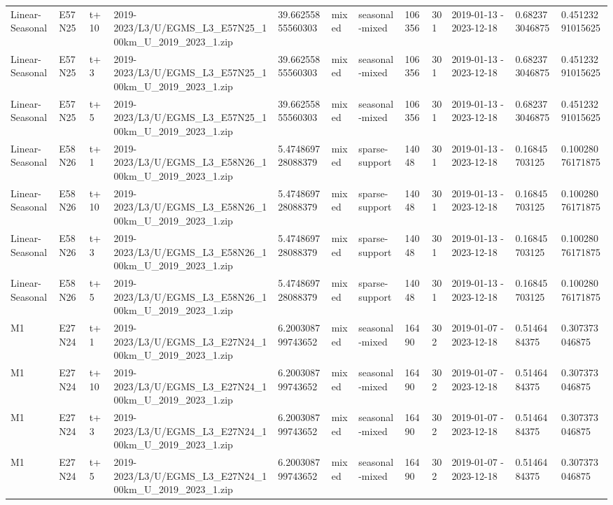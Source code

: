 \begin{landscape}
\begin{longtable}{llllllllllll}
Linear-Seasonal & E57N25 & t+10 & 2019-2023/L3/U/EGMS\_L3\_E57N25\_100km\_U\_2019\_2023\_1.zip & 39.66255855560303 & mixed & seasonal-mixed & 106356 & 301 & 2019-01-13 - 2023-12-18 & 0.682373046875 & 0.45123291015625 \\
Linear-Seasonal & E57N25 & t+3 & 2019-2023/L3/U/EGMS\_L3\_E57N25\_100km\_U\_2019\_2023\_1.zip & 39.66255855560303 & mixed & seasonal-mixed & 106356 & 301 & 2019-01-13 - 2023-12-18 & 0.682373046875 & 0.45123291015625 \\
Linear-Seasonal & E57N25 & t+5 & 2019-2023/L3/U/EGMS\_L3\_E57N25\_100km\_U\_2019\_2023\_1.zip & 39.66255855560303 & mixed & seasonal-mixed & 106356 & 301 & 2019-01-13 - 2023-12-18 & 0.682373046875 & 0.45123291015625 \\
Linear-Seasonal & E58N26 & t+1 & 2019-2023/L3/U/EGMS\_L3\_E58N26\_100km\_U\_2019\_2023\_1.zip & 5.474869728088379 & mixed & sparse-support & 14048 & 301 & 2019-01-13 - 2023-12-18 & 0.16845703125 & 0.10028076171875 \\
Linear-Seasonal & E58N26 & t+10 & 2019-2023/L3/U/EGMS\_L3\_E58N26\_100km\_U\_2019\_2023\_1.zip & 5.474869728088379 & mixed & sparse-support & 14048 & 301 & 2019-01-13 - 2023-12-18 & 0.16845703125 & 0.10028076171875 \\
Linear-Seasonal & E58N26 & t+3 & 2019-2023/L3/U/EGMS\_L3\_E58N26\_100km\_U\_2019\_2023\_1.zip & 5.474869728088379 & mixed & sparse-support & 14048 & 301 & 2019-01-13 - 2023-12-18 & 0.16845703125 & 0.10028076171875 \\
Linear-Seasonal & E58N26 & t+5 & 2019-2023/L3/U/EGMS\_L3\_E58N26\_100km\_U\_2019\_2023\_1.zip & 5.474869728088379 & mixed & sparse-support & 14048 & 301 & 2019-01-13 - 2023-12-18 & 0.16845703125 & 0.10028076171875 \\
M1 & E27N24 & t+1 & 2019-2023/L3/U/EGMS\_L3\_E27N24\_100km\_U\_2019\_2023\_1.zip & 6.200308799743652 & mixed & seasonal-mixed & 16490 & 302 & 2019-01-07 - 2023-12-18 & 0.5146484375 & 0.307373046875 \\
M1 & E27N24 & t+10 & 2019-2023/L3/U/EGMS\_L3\_E27N24\_100km\_U\_2019\_2023\_1.zip & 6.200308799743652 & mixed & seasonal-mixed & 16490 & 302 & 2019-01-07 - 2023-12-18 & 0.5146484375 & 0.307373046875 \\
M1 & E27N24 & t+3 & 2019-2023/L3/U/EGMS\_L3\_E27N24\_100km\_U\_2019\_2023\_1.zip & 6.200308799743652 & mixed & seasonal-mixed & 16490 & 302 & 2019-01-07 - 2023-12-18 & 0.5146484375 & 0.307373046875 \\
M1 & E27N24 & t+5 & 2019-2023/L3/U/EGMS\_L3\_E27N24\_100km\_U\_2019\_2023\_1.zip & 6.200308799743652 & mixed & seasonal-mixed & 16490 & 302 & 2019-01-07 - 2023-12-18 & 0.5146484375 & 0.307373046875 \\

\end{longtable}
\end{landscape}
